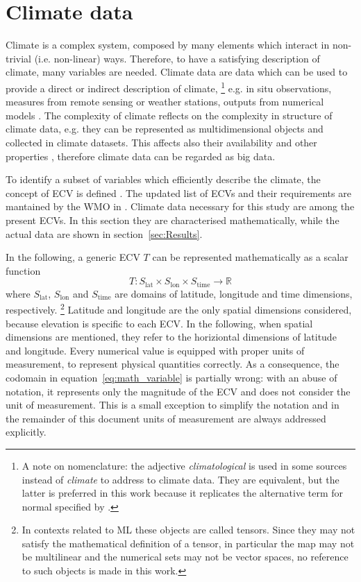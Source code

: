 \section{Climate data}
\label{sec:Climate data}
Climate is a complex system, composed by many elements which interact in non-trivial (i.e. non-linear) ways. Therefore, to have a satisfying description of climate, many variables are needed. Climate data are data which can be used to provide a direct or indirect description of climate,%
\footnote{A note on nomenclature: the adjective \emph{climatological} is used in some sources instead of \emph{climate} to address to climate data. They are equivalent, but the latter is preferred in this work because it replicates the alternative term for \gls{normal} specified by \cite[1]{2017WorldMeteorologicalOrganizationWMOWMOGuidelines}.}
e.g. in situ observations, measures from remote sensing or weather stations, outputs from numerical models \cite[1537]{2021SeneviratneWeatherAnd}. The complexity of climate reflects on the complexity in structure of climate data, e.g. they can be represented as multidimensional objects and collected in climate datasets. This affects also their availability and other properties \cite{2014FaghmousABig}, therefore climate data can be regarded as big data.

To identify a subset of variables which efficiently describe the climate, the concept of \gls{ECV} is defined \cite{2014BojinskiTheConcept}. The updated list of \glspl{ECV} and their requirements are mantained by the \gls{WMO} in \cite[14-17]{2022WorldMeteorologicalOrganizationWMOThe2022}.
Climate data necessary for this study are among the present \glspl{ECV}. In this section they are characterised mathematically, while the actual data are shown in section~\ref{sec:Results}.

In the following, a generic \gls{ECV} $T$ can be represented mathematically as a scalar function
\begin{equation}
  \label{eq:math_variable}
  T : S_\text{lat} \times S_\text{lon} \times S_\text{time} \to \mathbb{R}
\end{equation}
where $S_\text{lat}$, $S_\text{lon}$ and $S_\text{time}$ are domains of latitude, longitude and time dimensions, respectively.%
\footnote{In contexts related to \gls{ML} these objects are called tensors. Since they may not satisfy the mathematical definition of a tensor, in particular the map may not be multilinear and the numerical sets may not be vector spaces, no reference to such objects is made in this work.}
Latitude and longitude are the only spatial dimensions considered, because elevation is specific to each \gls{ECV}. In the following, when spatial dimensions are mentioned, they refer to the horiziontal dimensions of latitude and longitude.
Every numerical value is equipped with proper units of measurement, to represent physical quantities correctly. As a consequence, the codomain in equation~\eqref{eq:math_variable} is partially wrong: with an abuse of notation, it represents only the magnitude of the \gls{ECV} and does not consider the unit of measurement. This is a small exception to simplify the notation and in the remainder of this document units of measurement are always addressed explicitly.

